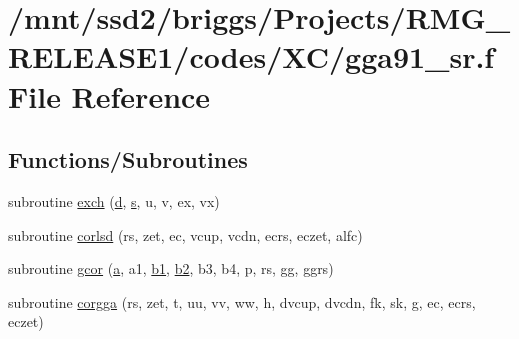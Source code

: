 \hypertarget{gga91__sr_8f}{\section{/mnt/ssd2/briggs/\-Projects/\-R\-M\-G\-\_\-\-R\-E\-L\-E\-A\-S\-E1/codes/\-X\-C/gga91\-\_\-sr.f File Reference}
\label{gga91__sr_8f}
}
\subsection*{Functions/\-Subroutines}
\begin{DoxyCompactItemize}
\item 
subroutine \hyperlink{gga91__sr_8f_af772febe95e6d5543e19f9612226e638}{exch} (\hyperlink{gga__xc__th_8c_a71729f52320926b2723634a38936f249}{d}, \hyperlink{_t_d_d_f_t_2_common_2init__wf__gaussian_8c_ac9562ee4ecb3b8aeebeb04656e7e57a9}{s}, u, v, ex, vx)
\item 
subroutine \hyperlink{gga91__sr_8f_a7ddd4939f8fa4a4932b065c28fcd4c24}{corlsd} (rs, zet, ec, vcup, vcdn, ecrs, eczet, alfc)
\item 
subroutine \hyperlink{gga91__sr_8f_a420b3b60476545c6ba00b97338c7a61d}{gcor} (\hyperlink{gga__xc__th_8c_abf59cc952e724dd76e644ff9480786d9}{a}, a1, \hyperlink{recips_8h_a3fc234f2038c252e1843e0e73b6025ac}{b1}, \hyperlink{recips_8h_aab3153114ef2102cc57095ccea37652a}{b2}, b3, b4, p, rs, gg, ggrs)
\item 
subroutine \hyperlink{gga91__sr_8f_acdbef878127a33b6b50d1b33eff668a8}{corgga} (rs, zet, t, uu, vv, ww, h, dvcup, dvcdn, fk, sk, g, ec, ecrs, eczet)
\end{DoxyCompactItemize}


